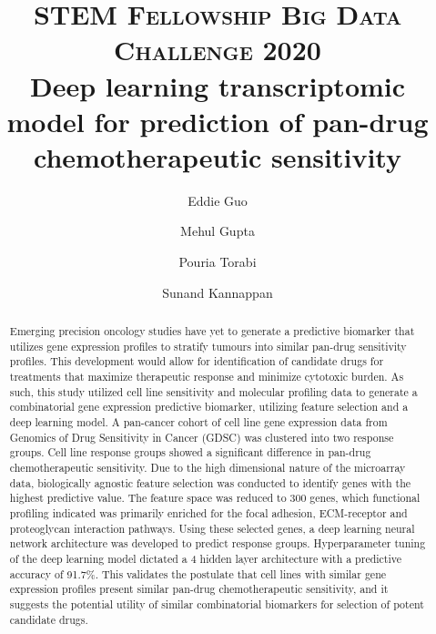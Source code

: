 \documentclass[10pt, letterpaper]{article}
\title{
    \usefont{OT1}{bch}{b}{n}
    \normalfont \normalsize \textsc{STEM Fellowship Big Data Challenge 2020} \\ [10pt]
    \huge Deep learning transcriptomic model for prediction of pan-drug chemotherapeutic sensitivity \\
}
\author[1]{Eddie Guo}
\author[2]{Mehul Gupta}
\author[1]{Pouria Torabi}
\author[2]{Sunand Kannappan}
\affil[1]{University of Alberta}
\affil[2]{University of Calgary}
\begin{document}
\maketitle


\begin{abstract}
	Emerging precision oncology studies have yet to generate a predictive biomarker that utilizes gene expression profiles to stratify tumours into similar pan-drug sensitivity profiles. This development would allow for identification of candidate drugs for treatments that maximize therapeutic response and minimize cytotoxic burden. As such, this study utilized cell line sensitivity and molecular profiling data to generate a combinatorial gene expression predictive biomarker, utilizing feature selection and a deep learning model. A pan-cancer cohort of cell line gene expression data from Genomics of Drug Sensitivity in Cancer (GDSC) was clustered into two response groups. Cell line response groups showed a significant difference in pan-drug chemotherapeutic sensitivity. Due to the high dimensional nature of the microarray data, biologically agnostic feature selection was conducted to identify genes with the highest predictive value. The feature space was reduced to 300 genes, which functional profiling indicated was primarily enriched for the focal adhesion, ECM-receptor and proteoglycan interaction pathways. Using these selected genes, a deep learning neural network architecture was developed to predict response groups. Hyperparameter tuning of the deep learning model dictated a 4 hidden layer architecture with a predictive accuracy of 91.7\%.  This validates the postulate that cell lines with similar gene expression profiles present similar pan-drug chemotherapeutic sensitivity, and it suggests the potential utility of similar combinatorial biomarkers for selection of potent candidate drugs. \vspace{1em}

\end{abstract} \vspace{1em}
\end{document}
